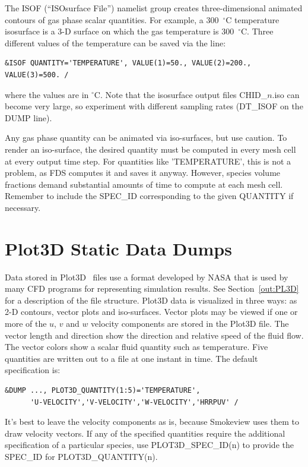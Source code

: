 \documentclass[11pt]{book}
\begin{document}
The {\ct ISOF} (``ISOsurface File'') namelist group creates three-dimensional animated contours of gas phase scalar quantities. For example, a 300~$^\circ$C temperature isosurface is a 3-D surface on which the gas temperature is 300~$^\circ$C. Three different values of the temperature can be saved via the line:
\begin{lstlisting}
&ISOF QUANTITY='TEMPERATURE', VALUE(1)=50., VALUE(2)=200., VALUE(3)=500. /
\end{lstlisting}
where the values are in $^\circ$C. Note that the isosurface output files {\ct CHID\_$n$.iso} can become very large, so experiment with different sampling rates ({\ct DT\_ISOF} on the {\ct DUMP} line).

Any gas phase quantity can be animated via iso-surfaces, but use caution. To render an iso-surface, the desired quantity must be computed in every mesh cell at every output time step. For quantities like {\ct 'TEMPERATURE'}, this is not a problem, as FDS computes it and saves it anyway. However, species volume fractions demand substantial amounts of time to compute at each mesh cell. Remember to include the {\ct SPEC\_ID} corresponding to the given {\ct QUANTITY} if necessary.




\section{Plot3D Static Data Dumps}
\label{info:PL3D}

Data stored in Plot3D~\cite{PLOT3D} files use a format developed by NASA that is used by many CFD programs for representing simulation results. See Section~\ref{out:PL3D} for a description of the file structure. Plot3D data is visualized in three ways: as 2-D contours, vector plots and iso-surfaces. Vector plots may be viewed if one or more of the $u$, $v$ and $w$ velocity components are stored in the Plot3D file. The vector length and direction show the direction and relative speed of the fluid flow. The vector colors show a scalar fluid quantity such as temperature. Five quantities are written out to a file at one instant in time. The default specification is:
\begin{lstlisting}
&DUMP ..., PLOT3D_QUANTITY(1:5)='TEMPERATURE',
      'U-VELOCITY','V-VELOCITY','W-VELOCITY','HRRPUV' /
\end{lstlisting}
It's best to leave the velocity components as is, because Smokeview uses them to draw velocity vectors. If any of the specified quantities require the additional specification of a particular species, use {\ct PLOT3D\_SPEC\_ID(n)} to provide the {\ct SPEC\_ID} for {\ct PLOT3D\_QUANTITY(n)}.
\end{document}
